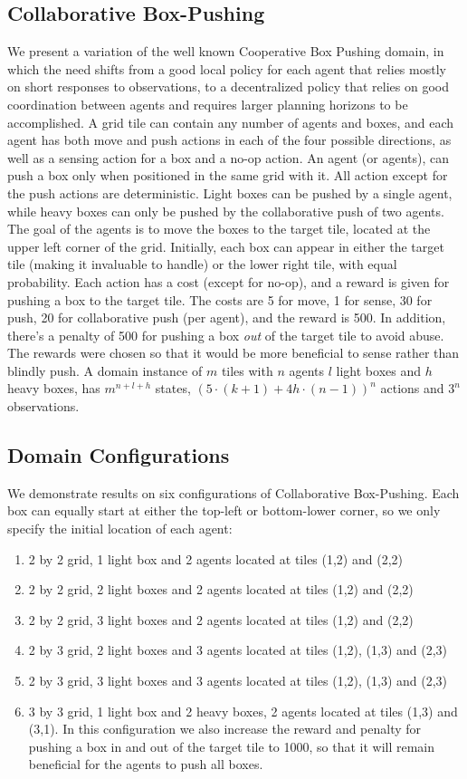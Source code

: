 \documentclass[letterpaper]{article} %
\newcommand{\cbp}[0]{Collaborative Box-Pushing}
\begin{document}
\subsection{\cbp}
We present a variation of the well known Cooperative Box Pushing domain, in which the need shifts from a good local policy for each agent that relies mostly on short responses to observations, to a decentralized policy that relies on good coordination between agents and requires larger planning horizons to be accomplished. A grid tile can contain any number of agents and boxes, and each agent has both move and push actions in each of the four possible directions, as well as a sensing action for a box and a no-op action.
An agent (or agents), can push a box only when positioned in the same grid with it.
All action except for the push actions are deterministic.
Light boxes can be pushed by a single agent, while heavy boxes can only be pushed by the collaborative push of two agents.
The goal of the agents is to move the boxes to the target tile, located at the upper left corner of the grid.
Initially, each box can appear in either the target tile (making it invaluable to handle) or the lower right tile, with equal probability.
Each action has a cost (except for no-op), and a reward is given for pushing a box to the target tile. The costs are 5 for move, 1 for sense, 30 for push, 20 for collaborative push (per agent), and the reward is 500. In addition, there's a penalty of 500 for pushing a box \emph{out} of the target tile to avoid abuse.
The rewards were chosen so that it would be more beneficial to sense rather than blindly push.
A domain instance of $m$ tiles with $n$ agents $l$ light boxes and $h$ heavy boxes, has $m^{n+l+h}$ states, $(5\cdot(k+1)+4h\cdot(n-1))^n$ actions and $3^n$ observations. 

\subsection{Domain Configurations}
We demonstrate results on six configurations of \cbp. Each box can equally start at either the top-left or bottom-lower corner, so we only specify the initial location of each agent:
\begin{enumerate}
    \item 2 by 2 grid, 1 light box and 2 agents located at tiles (1,2) and (2,2)
    \item 2 by 2 grid, 2 light boxes and 2 agents located at tiles (1,2) and (2,2)
    \item 2 by 2 grid, 3 light boxes and 2 agents located at tiles (1,2) and (2,2)
    \item 2 by 3 grid, 2 light boxes and 3 agents located at tiles (1,2), (1,3) and (2,3)
    \item 2 by 3 grid, 3 light boxes and 3 agents located at tiles (1,2), (1,3) and (2,3)
    \item 3 by 3 grid, 1 light box and 2 heavy boxes, 2 agents located at tiles (1,3) and (3,1). In this configuration we also increase the reward and penalty for pushing a box in and out of the target tile to 1000, so that it will remain beneficial for the agents to push all boxes.
\end{enumerate}
\end{document}
